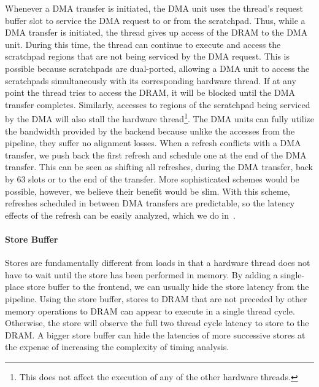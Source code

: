 Whenever a DMA transfer is initiated, the DMA unit uses the thread's request buffer slot to service the DMA request to or from the scratchpad. 
Thus, while a DMA transfer is initiated, the thread gives up access of the DRAM to the DMA unit.
During this time, the thread can continue to execute and access the scratchpad regions that are not being serviced by the DMA request. 
This is possible because scratchpads are dual-ported, allowing a DMA unit to access the scratchpads simultaneously with its corresponding hardware thread.
If at any point the thread tries to access the DRAM, it will be blocked until the DMA transfer completes.
Similarly, accesses to regions of the scratchpad being serviced by the DMA will also stall the hardware thread\footnote{This does not affect the execution of any of the other hardware threads.}.
The DMA units can fully utilize the bandwidth provided by the backend because unlike the accesses from the pipeline, they suffer no alignment losses.
When a refresh conflicts with a DMA transfer, we push back the first refresh and schedule one at the end of the DMA transfer. 
This can be seen as shifting all refreshes, during the DMA transfer, back by $63$ slots or to the end of the transfer.
More sophisticated schemes would be possible, however, we believe their benefit would be slim.
With this scheme, refreshes scheduled in between DMA transfers are predictable, so the latency effects of the refresh can be easily analyzed, which we do in~\cite{ReinekeLiuPatelKimLee11_PRETDRAMControllerBankPrivatizationForPredictability}.

\paragraph{Store Buffer}
\label{sec:ptarm_dram_store_buffer}
Stores are fundamentally different from loads in that a hardware thread does not have to wait until the store has been performed in memory.
By adding a single-place store buffer to the frontend, we can usually hide the store latency from the pipeline.
Using the store buffer, stores to DRAM that are not preceded by other memory operations to DRAM can appear to execute in a single thread cycle.
Otherwise, the store will observe the full two thread cycle latency to store to the DRAM.
A bigger store buffer can hide the latencies of more successive stores at the expense of increasing the complexity of timing analysis.

